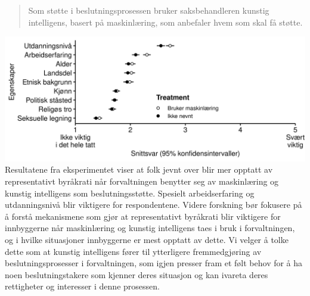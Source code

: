\documentclass[
]{book}
\begin{document}
\begin{quote}
Som støtte i beslutningsprosessen bruker saksbehandleren kunstig intelligens, basert på maskinlæring, som anbefaler hvem som skal få støtte.
\end{quote}

\includegraphics{figs/png/fig_exp_repr_each.png}
Resultatene fra eksperimentet viser at folk jevnt over blir mer opptatt av representativt byråkrati når forvaltningen benytter seg av maskinlæring og kunstig intelligens som beslutningsstøtte.
Spesielt arbeidserfaring og utdanningsnivå blir viktigere for respondentene.
Videre forskning bør fokusere på å forstå mekanismene som gjør at representativt byråkrati blir viktigere for innbyggerne når maskinlæring og kunstig intelligens taes i bruk i forvaltningen, og i hvilke situasjoner innbyggerne er mest opptatt av dette.
Vi velger å tolke dette som at kunstig intelligens fører til ytterligere fremmedgjøring av beslutningsprosesser i forvaltningen, som igjen presser fram et følt behov for å ha noen beslutningstakere som kjenner deres situasjon og kan ivareta deres rettigheter og interesser i denne prosessen.

  
\end{document}

